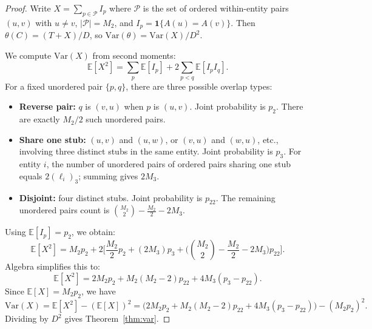 \documentclass[11pt]{article}
\newcommand{\E}{\mathbb{E}}
\newcommand{\Var}{\mathrm{Var}}
\newcommand{\1}{\mathbf{1}}
\newcommand{\fall}[2]{\left(#1\right)_{#2}} %
\theoremstyle{plain}
\theoremstyle{definition}
\begin{document}
\begin{proof}
Write $X=\sum_{p\in \mathcal{P}} I_p$ where $\mathcal{P}$ is the set of ordered within-entity pairs $(u,v)$ with $u\ne v$, $|\mathcal{P}|=M_2$, and $I_p=\1\{A(u)=A(v)\}$.
Then $\theta(C)=(T+X)/D$, so $\Var(\theta)=\Var(X)/D^2$.

We compute $\Var(X)$ from second moments:
\[
\E[X^2] = \sum_{p} \E[I_p] + 2\sum_{p<q}\E[I_p I_q].
\]
For a fixed unordered pair $\{p,q\}$, there are three possible overlap types:
\begin{itemize}[leftmargin=*]
\item \textbf{Reverse pair:} $q$ is $(v,u)$ when $p$ is $(u,v)$. Joint probability is $p_2$.
There are exactly $M_2/2$ such unordered pairs.
\item \textbf{Share one stub:} $(u,v)$ and $(u,w)$, or $(v,u)$ and $(w,u)$, etc., involving three distinct stubs in the same entity. Joint probability is $p_3$.
For entity $i$, the number of unordered pairs of ordered pairs sharing one stub equals $2\fall{\ell_i}{3}$; summing gives $2M_3$.
\item \textbf{Disjoint:} four distinct stubs. Joint probability is $p_{22}$.
The remaining unordered pairs count is $\binom{M_2}{2} - \frac{M_2}{2} - 2M_3$.
\end{itemize}

Using $\E[I_p]=p_2$, we obtain:
\[
\E[X^2]
=
M_2 p_2
+ 2\Big[
\frac{M_2}{2}p_2 + (2M_3)p_3
+ \Big(\binom{M_2}{2} - \frac{M_2}{2} - 2M_3\Big)p_{22}
\Big].
\]
Algebra simplifies this to:
\[
\E[X^2] = 2M_2 p_2 + M_2(M_2-2)p_{22} + 4M_3(p_3-p_{22}).
\]
Since $\E[X]=M_2 p_2$, we have
\[
\Var(X) = \E[X^2] - (\E[X])^2
=
\Big(2M_2 p_2 + M_2(M_2-2)p_{22} + 4M_3(p_3-p_{22})\Big) - (M_2 p_2)^2.
\]
Dividing by $D^2$ gives Theorem~\ref{thm:var}.
\end{proof}
\end{document}
